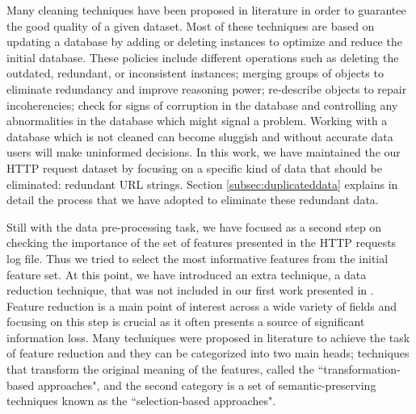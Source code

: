 \documentclass{llncs}
\begin{document}
Many cleaning techniques have been proposed in literature
\cite{wilson2001maintaining} in order to guarantee the good quality of
a given dataset.   Most of these techniques are based on updating a
database by adding or deleting instances to optimize and reduce the
initial database.  %
These policies include different operations such as deleting the
outdated, redundant, or inconsistent instances; merging groups of
objects to eliminate redundancy and improve reasoning power;
re-describe objects to repair incoherencies; check for signs of
corruption in the database and controlling any abnormalities in the
database which might signal a problem. Working with a database which is not
cleaned %
can become sluggish %
and without accurate data users will make uninformed decisions. In
this work, we have maintained the our HTTP request dataset by focusing
on a specific kind of data that should be eliminated:
redundant URL strings. Section \ref{subsec:duplicateddata} explains in
detail the process that we have adopted to eliminate these redundant
data.

Still with the data pre-processing task, we have focused as a second
step on checking the importance of the %
  set of features presented in the HTTP requests log file. Thus
 we tried to select the most informative features from the initial
 feature set. At this point, we have introduced an extra technique, a
 data reduction technique, that was not included in our first work
 presented in \cite{ECTA}.  %
Feature reduction %
is a main point of interest across a wide
variety of fields and focusing on this step is crucial as it
often presents a source of significant information loss. %
Many techniques were
proposed in literature to achieve the task of feature reduction %
 and they
can be categorized into two main heads; techniques that transform the
original meaning of the features, called the ``transformation-based
approaches", and the second category is a set of semantic-preserving
techniques known as the ``selection-based approaches".
\end{document}
